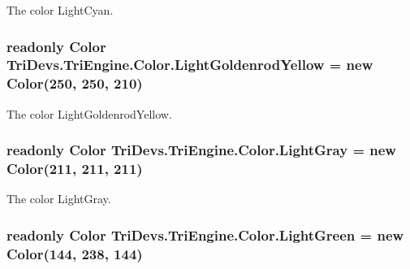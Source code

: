 The color Light\-Cyan. 

\hypertarget{struct_tri_devs_1_1_tri_engine_1_1_color_a68cc5b73f18d3fe336459b442becb8f0}{
\subsubsection[{Light\-Goldenrod\-Yellow}]{\setlength{\rightskip}{0pt plus 5cm}readonly {\bf Color} Tri\-Devs.\-Tri\-Engine.\-Color.\-Light\-Goldenrod\-Yellow = new {\bf Color}(250, 250, 210)\hspace{0.3cm}{\ttfamily [static]}}}\label{struct_tri_devs_1_1_tri_engine_1_1_color_a68cc5b73f18d3fe336459b442becb8f0}


The color Light\-Goldenrod\-Yellow. 

\hypertarget{struct_tri_devs_1_1_tri_engine_1_1_color_ac3a58bd4b33167b4f531f13c5a29f966}{
\subsubsection[{Light\-Gray}]{\setlength{\rightskip}{0pt plus 5cm}readonly {\bf Color} Tri\-Devs.\-Tri\-Engine.\-Color.\-Light\-Gray = new {\bf Color}(211, 211, 211)\hspace{0.3cm}{\ttfamily [static]}}}\label{struct_tri_devs_1_1_tri_engine_1_1_color_ac3a58bd4b33167b4f531f13c5a29f966}


The color Light\-Gray. 

\hypertarget{struct_tri_devs_1_1_tri_engine_1_1_color_aba7bbdb83e025ba4a66c99daf2caec70}{
\subsubsection[{Light\-Green}]{\setlength{\rightskip}{0pt plus 5cm}readonly {\bf Color} Tri\-Devs.\-Tri\-Engine.\-Color.\-Light\-Green = new {\bf Color}(144, 238, 144)\hspace{0.3cm}{\ttfamily [static]}}}\label{struct_tri_devs_1_1_tri_engine_1_1_color_aba7bbdb83e025ba4a66c99daf2caec70}


